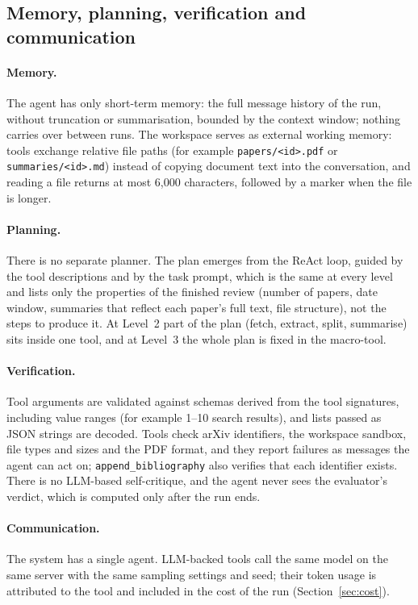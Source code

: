 \subsection{Memory, planning, verification and communication}
\label{sec:mechanisms}

\paragraph{Memory.} The agent has only short-term memory: the full message history of the run, without truncation or summarisation, bounded by the context window; nothing carries over between runs. The workspace serves as external working memory: tools exchange relative file paths (for example \texttt{papers/<id>.pdf} or \texttt{summaries/<id>.md}) instead of copying document text into the conversation, and reading a file returns at most 6{,}000 characters, followed by a marker when the file is longer.

\paragraph{Planning.} There is no separate planner. The plan emerges from the ReAct loop, guided by the tool descriptions and by the task prompt, which is the same at every level and lists only the properties of the finished review (number of papers, date window, summaries that reflect each paper's full text, file structure), not the steps to produce it. At Level~2 part of the plan (fetch, extract, split, summarise) sits inside one tool, and at Level~3 the whole plan is fixed in the macro-tool.

\paragraph{Verification.} Tool arguments are validated against schemas derived from the tool signatures, including value ranges (for example 1--10 search results), and lists passed as JSON strings are decoded. Tools check arXiv identifiers, the workspace sandbox, file types and sizes and the PDF format, and they report failures as messages the agent can act on; \texttt{append\_bibliography} also verifies that each identifier exists. There is no LLM-based self-critique, and the agent never sees the evaluator's verdict, which is computed only after the run ends.

\paragraph{Communication.} The system has a single agent. LLM-backed tools call the same model on the same server with the same sampling settings and seed; their token usage is attributed to the tool and included in the cost of the run (Section~\ref{sec:cost}).

